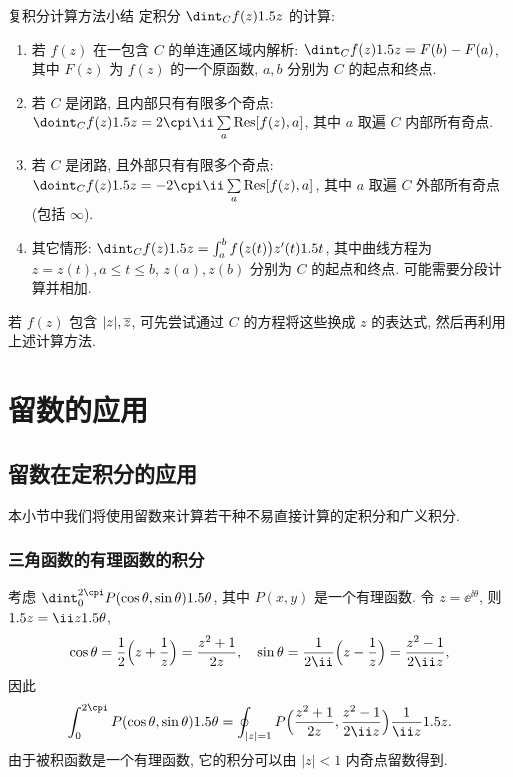 \begin{fifth}{复积分计算方法小结}
  定积分 $\dint_Cf(z)\d z$ 的计算:
  \begin{enumerate}
    \item 若 $f(z)$ 在一包含 $C$ 的单连通区域内解析: 
    $\dint_C f(z)\d z=F(b)-F(a)$, 
    其中 $F(z)$ 为 $f(z)$ 的一个原函数, $a,b$ 分别为 $C$ 的起点和终点.
    \item 若 $C$ 是闭路, 且内部只有有限多个奇点: 
    $\doint_C f(z)\d z=2\cpi\ii\suml_a \Res[f(z),a]$, 
    其中 $a$ 取遍 $C$ 内部所有奇点.
    \item 若 $C$ 是闭路, 且外部只有有限多个奇点: 
    $\doint_C f(z)\d z=-2\cpi\ii\suml_a \Res[f(z),a]$, 
    其中 $a$ 取遍 $C$ 外部所有奇点(包括 $\infty$).
    \item 其它情形: 
    $\dint_Cf(z)\d z=\int_a^b f\bigl(z(t)\bigr)z'(t)\d t$, 
    其中曲线方程为 $z=z(t),a\le t\le b$, $z(a),z(b)$ 分别为 $C$ 的起点和终点. 可能需要分段计算并相加.
  \end{enumerate}
\end{fifth}

若 $f(z)$ 包含 $|z|,\overline z$, 可先尝试通过 $C$ 的方程将这些换成 $z$ 的表达式, 然后再利用上述计算方法.



\section{留数的应用}

\subsection{留数在定积分的应用}

本小节中我们将使用留数来计算若干种不易直接计算的定积分和广义积分.

\subsubsection{三角函数的有理函数的积分}

考虑 $\dint_0^{2\cpi} P(\cos\theta,\sin\theta)\d\theta$, 其中 $P(x,y)$ 是一个有理函数.
令 $z=\ee^{\ii \theta}$, 则 $\d z=\ii z\d\theta$,
\[
   \cos\theta
  =\half\Bigl(z+\frac1z\Bigr)
  =\frac{z^2+1}{2z},\quad
  \sin\theta
  =\frac1{2\ii}\Bigl(z-\frac1z\Bigr)
  =\frac{z^2-1}{2\ii z},
\]
因此
\begin{equation}
  \label{eq:rational-function-sin-cos}
   \int_0^{2\cpi} P(\cos\theta,\sin\theta)\d\theta
  =\oint_{|z|=1} P\Bigl(\frac{z^2+1}{2z},\frac{z^2-1}{2\ii z}\Bigr)\frac1{\ii z}\d z.
\end{equation}
由于被积函数是一个有理函数, 它的积分可以由 $|z|<1$ 内奇点留数得到.

